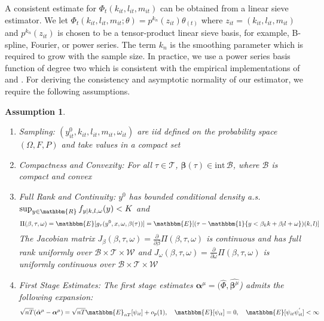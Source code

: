 \documentclass[11pt]{article}
\newtheorem{assump}{Assumption}[section]
\begin{document}
A consistent estimate for $\Phi_{t}(k_{it}, l_{it}, m_{it})$ can be obtained from a linear sieve estimator. We let $\Phi_{t}(k_{it}, l_{it}, m_{it};\theta)=p^{k_{n}}(z_{it})\theta_{(t)}$ where $z_{it}=(k_{it}, l_{it}, m_{it})$ and $p^{k_{n}}(z_{it})$ is chosen to be a tensor-product linear sieve basis, for example, B-spline, Fourier, or power series. The term $k_{n}$ is the smoothing parameter which is required to grow with the sample size.  In practice, we use a power series basis function of degree two which is consistent with the empirical implementations of \cite{Levinsohn2003} and \cite{Ackerberg2015}. For deriving the consistency and asymptotic normality of our estimator, we require the following assumptions.
\begin{assump} \label{asymptotics1}
\leavevmode
	\begin{enumerate}[label=(\alph*)]
		\item Sampling: $(y^{0}_{it}, k_{it}, l_{it}, m_{it}, \omega_{it})$ are iid defined on the probability space $(\Omega, F, P)$ and take values in a compact set
		\item Compactness and Convexity: For all $\tau\in \mathcal{T}$, $\boldsymbol{\beta}(\tau)\in \text{int} \, \mathcal{B}$, where $\mathcal{B}$ is compact and convex
		\item Full Rank and Continuity: $y^{0}$ has bounded conditional density a.s. $\sup_{y\in \mathbbm{R}}f_{y|k,l,\omega}(y)<K$ and
		\begin{equation*}
		\Pi(\beta, \tau, \omega)=\mathbbm{E}[g_{\tau}(y^{0},x,\omega,\beta(\tau))]=\mathbbm{E}[(\tau-\mathbbm{1}\{y<\beta_{k}k+\beta_{l}l+\omega\})(k,l)]
		\end{equation*}
		The Jacobian matrix $J_{\beta}(\beta, \tau, \omega)=\frac{\partial}{\partial\beta}\Pi(\beta, \tau, \omega)$ is continuous and has full rank uniformly over $\mathcal{B}\times\mathcal{T}\times\mathcal{W}$ and $J_{\omega}(\beta, \tau, \omega)=\frac{\partial}{\partial\omega}\Pi(\beta, \tau, \omega)$ is uniformly continuous over $\mathcal{B}\times\mathcal{T}\times\mathcal{W}$ 
		\item First Stage Estimates: The first stage estimates $\boldsymbol{\alpha}^{\mu}=(\hat{\Phi}, \hat{\boldsymbol{\beta}^{\mu}}$) admits the following expansion:
		\begin{equation*}
			\sqrt{nT}(\hat{\boldsymbol{\alpha}}^{\mu}-\boldsymbol{\alpha}^{\mu})=\sqrt{nT}\mathbbm{E}_{nT}[\psi_{it}]+o_{p}(1),\quad \mathbbm{E}[\psi_{it}]=0, \quad \mathbbm{E}[\psi_{it}\psi_{it}^{'}]<\infty
		\end{equation*}
	\end{enumerate}
\end{assump}
\end{document}
